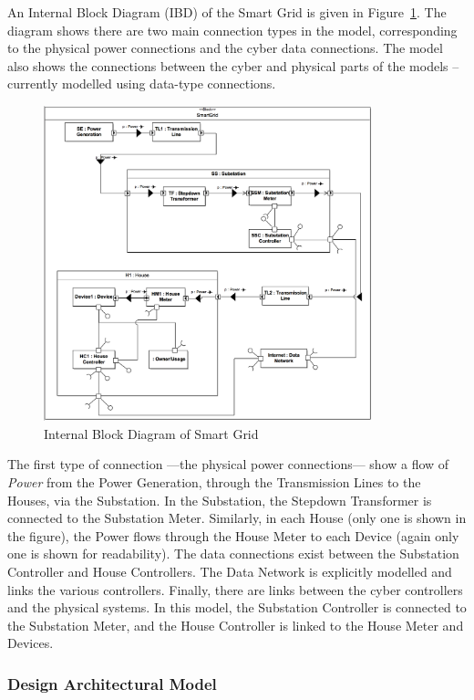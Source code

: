 An Internal Block Diagram (IBD) of the Smart Grid is given in Figure~\ref{fig:ibd}. The diagram shows there are two main connection types in the model, corresponding to the physical power connections and the cyber data connections. The model also shows the connections between the cyber and physical parts of the models -- currently modelled using data-type connections.

\begin{figure}
\centering
\includegraphics[width=0.85\textwidth]{figures/IBDSmartGrid}
\caption{Internal Block Diagram of Smart Grid}
\label{fig:ibd}
\end{figure}

The first type of connection ---the physical power connections--- show a flow of \textit{Power} from the Power Generation, through the Transmission Lines to the Houses, via the Substation. In the Substation, the Stepdown Transformer is connected to the Substation Meter. Similarly, in each House (only one is shown in the figure), the Power flows through the House Meter to each Device (again only one is shown for readability). The data connections exist between the Substation Controller and House Controllers. The Data Network is explicitly modelled and links the various controllers. Finally, there are links between the cyber controllers and the physical systems. In this model, the Substation Controller is connected to the Substation Meter, and the House Controller is linked to the House Meter and Devices.

\subsubsection*{Design Architectural Model}

